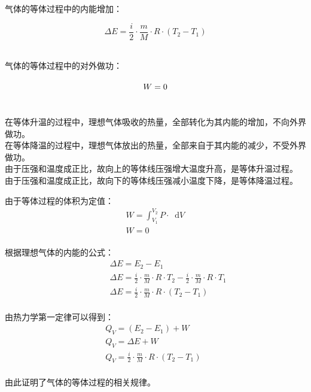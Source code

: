 \documentclass[UTF8]{ctexart}
\newcommand*{\dif}{\mathop{}\!\mathrm{d}}
\begin{document}
    气体的等体过程中的内能增加：
    \begin{large}
        \begin{equation*}
            \Delta E=\frac{i}{2}\cdot\frac{m}{M}\cdot R\cdot(T_2-T_1)
        \end{equation*}
    \end{large}\\
    气体的等体过程中的对外做功：
    \begin{large}
        \begin{equation*}
            W=0\vphantom{\frac{a}{b}}
        \end{equation*}
    \end{large}\\
    在等体升温的过程中，理想气体吸收的热量，全部转化为其内能的增加，不向外界做功。\\[3mm]
    在等体降温的过程中，理想气体放出的热量，全部来自于其内能的减少，不受外界做功。\\[3mm]
    由于压强和温度成正比，故向上的等体线压强增大温度升高，是等体升温过程。\\[3mm]
    由于压强和温度成正比，故向下的等体线压强减小温度下降，是等体降温过程。

\newpage

    由于等体过程的体积为定值：
    \begin{align}
        &W=\int_{V_1}^{V_2} P\cdot\dif V~~~~\\[4mm]
        &W=0
    \end{align}\\
    根据理想气体的内能的公式：
    \begin{align}
        &~~~~~~~~~~\Delta E=E_2-E_1\\[4mm]
        &~~~~~~~~~~\Delta E=\frac{i}{2}\cdot\frac{m}{M}\cdot R\cdot T_2-\frac{i}{2}\cdot\frac{m}{M}\cdot R\cdot T_1\\[4mm]
        &~~~~~~~~~~\Delta E=\frac{i}{2}\cdot\frac{m}{M}\cdot R\cdot (T_2-T_1)
    \end{align}\\
    由热力学第一定律可以得到：
    \begin{align}
        &Q_V=(E_2-E_1)+W\\[4mm]
        &Q_V=\Delta E+W\\[4mm]
        &Q_V=\frac{i}{2}\cdot\frac{m}{M}\cdot R\cdot (T_2-T_1)~~~~~~
    \end{align}\\
    由此证明了气体的等体过程的相关规律。

\newpage
\end{document}
